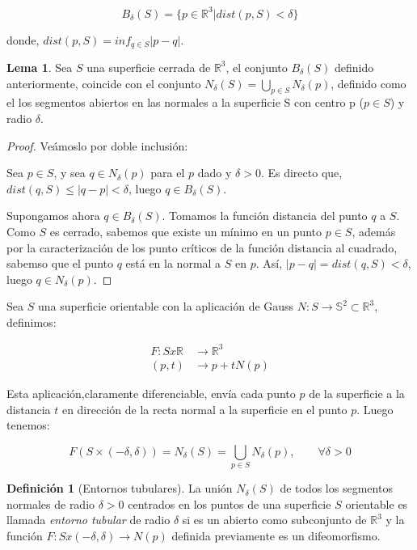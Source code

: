\documentclass[paper=a4, fontsize=11pt, spanish]{scrartcl}
\newcommand{\rtres}{\mathbb{R}^3}
\theoremstyle{definition}
\newtheorem{lemma}[theorem]{Lema}
\theoremstyle{definition}
\newtheorem{definition}{Definición}
\theoremstyle{definition}
\begin{document}
\begin{equation*}
    B_\delta(S)=\{p\in \rtres | dist(p,S) < \delta\}
\end{equation*}

donde, $dist(p,S) = inf_{q\in S}|p-q|$.

\begin{lemma}
Sea $S$ una superficie cerrada de $\rtres$, el conjunto $B_\delta(S)$ definido anteriormente, coincide con el conjunto $N_\delta(S)=\bigcup_{p\in S}N_\delta(p)$, definido como el los segmentos abiertos en las normales a la superficie S con centro p ($p \in S$) y radio $\delta$.
\end{lemma}
\begin{proof}
Veámoslo por doble inclusión:

Sea $p \in S$, y sea $q \in N_\delta(p)$ para el $p$ dado y $\delta > 0$. Es directo que, $dist(q,S) \leq |q-p| < \delta$, luego $q \in B_\delta(S)$.

Supongamos ahora $q \in B_\delta(S)$. Tomamos la función distancia del punto $q$ a $S$. Como $S$ es cerrado, sabemos que existe un mínimo en un punto $p \in S$, además por la caracterización de los punto críticos de la función distancia al cuadrado, sabemso que el punto $q$ está en la normal a $S$ en $p$. Así, $|p-q| = dist(q,S) < \delta$, luego $q \in N_\delta(p)$.
\end{proof}

Sea $S$ una superficie orientable con la aplicación de Gauss $N: S \longrightarrow \mathbb{S}^2 \subset \rtres$, definimos:

\begin{align*}
    F: S x \mathbb{R} &\longrightarrow \rtres \\
    (p,t) &\longrightarrow p + tN(p)
\end{align*}

Esta aplicación,claramente diferenciable, envía cada punto $p$ de la superficie a la distancia $t$ en dirección de la recta normal a la superficie en el punto $p$. Luego tenemos:

\begin{equation*}
    F(S \times (-\delta, \delta)) = N_\delta(S)=\bigcup_{p\in S} N_\delta(p), \qquad \forall \delta > 0
\end{equation*}

\begin{definition}[Entornos tubulares]
La unión $N_\delta(S)$ de todos los segmentos normales de radio $\delta > 0$ centrados en los puntos de una superficie $S$ orientable es llamada \textit{entorno tubular} de radio $\delta$ si es un abierto como subconjunto de $\rtres$ y la función $F: S x (-\delta, \delta) \longrightarrow N(p)$ definida previamente es un difeomorfismo.
\end{definition}
\end{document}
